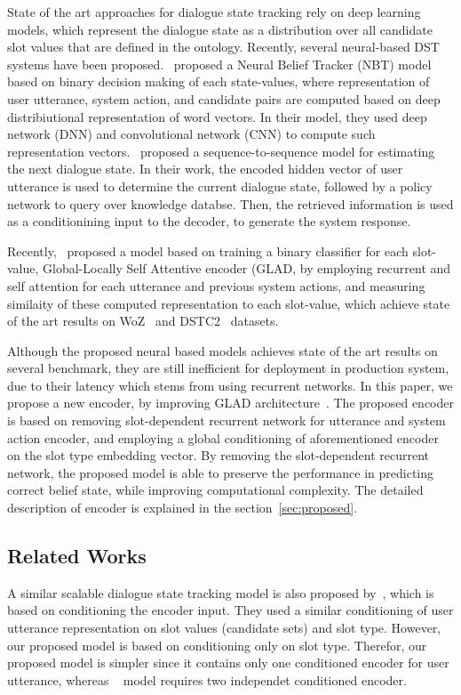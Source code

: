 \documentclass{article}
\begin{document}
State of the art approaches for dialogue state tracking rely on deep learning models,
which represent the dialogue state as a distribution over all candidate slot values that are defined in the ontology. 
Recently, several neural-based DST systems have been proposed.~\cite{Mrksic2017NeuralBT} proposed a Neural Belief Tracker (NBT) model based on binary decision making of each state-values, where representation of user utterance, system action, and candidate pairs are computed based on deep distribiutional representation of word vectors. In their model, they used deep network (DNN) and convolutional network (CNN) to compute such representation vectors.~\cite{Wen2017ANE} proposed a sequence-to-sequence model for estimating the next dialogue state. In their work, the encoded hidden vector of user utterance is used to determine the current dialogue state, followed by a policy network to query over knowledge databse. Then, the retrieved information is used as a conditionining input to the decoder, to generate the system response. 


Recently,~\cite{Zhong2018GlobalLocallySD} proposed a model based on training a binary classifier for each slot-value, Global-Locally Self Attentive encoder (GLAD, by employing recurrent and self attention for each utterance and previous system actions, and measuring similaity of these computed representation to each slot-value, which achieve state of the art results on WoZ~\citep{Wen2017ANE} and DSTC2~\citep{Williams2013TheDS} datasets. 


Although the proposed neural based models achieves state of the art results on several benchmark, they are still inefficient for deployment in production system, due to their latency which stems from using recurrent networks. 
 In this paper, we propose a new encoder, by improving GLAD architecture~\citep{Zhong2018GlobalLocallySD}. The proposed encoder is based on removing slot-dependent recurrent network for utterance and system action encoder, and employing a global conditioning of aforementioned encoder on the slot type embedding vector. By removing the slot-dependent recurrent network, the proposed model is able to preserve the performance in predicting correct belief state, while improving computational complexity. The detailed description of encoder is explained in the section~\ref{sec:proposed}.

\subsection{Related Works}
\label{seq:related}
A similar scalable dialogue state tracking model is also proposed by~\cite{Rastogi2017ScalableMD}, which is based on conditioning the encoder input. They used a similar conditioning of user utterance representation on slot values (candidate sets) and slot type. 
However, our proposed model is based on conditioning only on slot type. 
Therefor, our proposed model is simpler since it contains only one conditioned encoder for user utterance, whereas ~\cite{Rastogi2017ScalableMD} model requires two independet conditioned encoder. 
\end{document}
